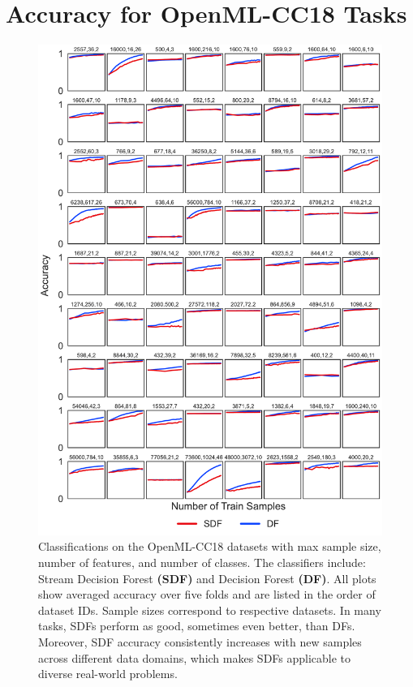 \clearpage

\section{Accuracy for OpenML-CC18 Tasks}
\label{app:cc18}

\begin{figure}[!htpb]
\centering
\includegraphics[width=0.75\columnwidth]{cc18_wide}
  \caption{Classifications on the OpenML-CC18 datasets with max sample size, number of features, and number of classes. The classifiers include: Stream Decision Forest \textbf{(SDF)} and Decision Forest \textbf{(DF)}. 
  All plots show averaged accuracy over five folds and are listed in the order of dataset IDs. Sample sizes correspond to respective datasets. In many tasks, SDFs perform as good, sometimes even better, than DFs. Moreover, SDF accuracy consistently increases with new samples across different data domains, which makes SDFs applicable to diverse real-world problems.
  }
\label{fig:cc18}
\end{figure}

